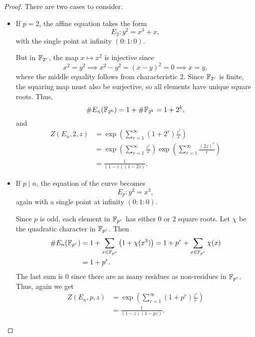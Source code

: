 \documentclass[12pt, a4paper]{amsart}
\begin{document}
\begin{proof}
  There are two cases to consider.
  \begin{itemize}
  \item If $p = 2$, the affine equation takes the form
    \[E_2: y^2 = x^3 + x,\] with the single point at infinity $(0:1:0).$

    But in $\mathbb{F}_{2^r}$, the map $x \mapsto x^2$ is injective since
    \[x^2 = y^2 \implies x^2-y^2 = (x-y)^2 = 0 \implies x = y,\] where the
    middle equality follows from characteristic 2. Since
    $\mathbb{F}_{2^r}$ is finite, the squaring map must also be surjective, so all
    elements have unique square roots. Thus,
    \[\# E_n(\mathbb{F}_{2^k}) = 1 + \# \mathbb{F}_{2^k} = 1 + 2^{k},\] and
    \begin{equation*}
      \begin{align}
        Z(E_n,2,z) &= \exp \left( \sum\limits_{r=1}^\infty (1 + 2^r)\frac{z^r}{r}
                     \right) \\
                   &= \exp \left( \sum\limits_{r=1}^\infty \frac{z^r}{r} \right) 
                     \exp \left( \sum\limits_{r=1}^\infty \frac{(2z)^r}{r} \right) \\
                   &= \frac{1}{(1-z)(1-2z)}.
      \end{align}
    \end{equation*}
  \item If $p \mid n$, the equation of the curve becomes
    \[E_p: y^2 = x^3,\]
    again with a single point at infinity $(0:1:0)$.

    Since $p$ is odd, each element in $\mathbb{F}_{p^r}$ has either 0 or 2 square
    roots. Let $\chi$ be the quadratic character in $\mathbb{F}_{p^r}$. Then
    \begin{equation*}
      \begin{align}
        \# E_n(\mathbb{F}_{p^r}) &= 1 + \sum\limits_{x \in \mathbb{F}_{p^r}}
        \left( 1 + \chi(x^3) \right) = 1 + p^r + \sum\limits_{x \in \mathbb{F}_{p^r}}
                            \chi(x)  \\
                          &= 1 + p^r.
      \end{align}
    \end{equation*}
    The last sum is 0 since there are as many residues as non-residues in $\mathbb{F}_{p^r}.$ 
    Thus, again we get
    \begin{equation*}
      \begin{align}
        Z(E_n, p, z) &= \exp \left(\sum\limits_{r=1}^\infty (1+p^r) \frac{z^r}{r}\right) \\
                     &= \frac{1}{(1-z)(1-pz)}.
      \end{align}
    \end{equation*}
    
  \end{itemize}
  
  
\end{proof}
\end{document}
